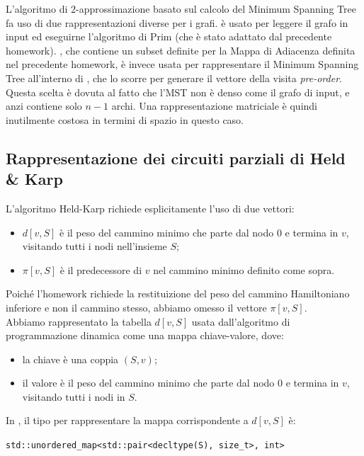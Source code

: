 \noindent L'algoritmo di $2$-approssimazione basato sul calcolo del Minimum Spanning Tree fa uso di due rappresentazioni diverse per i grafi.
 è usato per leggere il grafo in input ed eseguirne l'algoritmo di Prim (che è stato adattato dal precedente homework). , che contiene un subset definite per la Mappa di Adiacenza definita nel precedente homework, è invece usata per rappresentare il Minimum Spanning Tree all'interno di , che lo scorre per generare il vettore della visita \textit{pre-order}. Questa scelta è dovuta al fatto che l'MST non è denso come il grafo di input, e anzi contiene solo $n - 1$ archi. Una rappresentazione matriciale è quindi inutilmente costosa in termini di spazio in questo caso.

\newpage
\subsection{Rappresentazione dei circuiti parziali di Held \& Karp}

L'algoritmo Held-Karp richiede esplicitamente l'uso di due vettori:
\begin{itemize}
    \item $d[v,S]$ è il peso del cammino minimo che parte dal nodo $0$ e termina in $v$, visitando tutti i nodi nell'insieme $S$;
    \item $\pi[v,S]$ è il predecessore di $v$ nel cammino minimo definito come sopra.
\end{itemize}

\noindent Poiché l'homework richiede la restituizione del peso del cammino Hamiltoniano inferiore e non il cammino stesso, abbiamo omesso il vettore $\pi[v,S]$. \\

\noindent Abbiamo rappresentato la tabella $d[v,S]$ usata dall'algoritmo di programmazione dinamica come una mappa chiave-valore, dove:

\begin{itemize}
    \item la chiave è una coppia $(S, v)$;
    \item il valore è il peso del cammino minimo che parte dal nodo 0 e termina in $v$, visitando tutti i nodi in $S$.
\end{itemize}

\noindent In , il tipo per rappresentare la mappa corrispondente a $d[v,S]$ è:

\begin{center}
    \texttt{std::unordered_map<std::pair<decltype(S), size_t>, int>}
\end{center}

